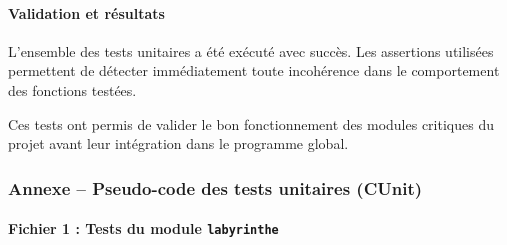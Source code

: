 \paragraph{Validation et résultats}

L’ensemble des tests unitaires a été exécuté avec succès.
Les assertions utilisées permettent de détecter immédiatement toute incohérence
dans le comportement des fonctions testées.

Ces tests ont permis de valider le bon fonctionnement des modules critiques du projet
avant leur intégration dans le programme global.

\subsubsection*{Annexe -- Pseudo-code des tests unitaires (CUnit)}

\paragraph{Fichier 1 : Tests du module \texttt{labyrinthe}}

